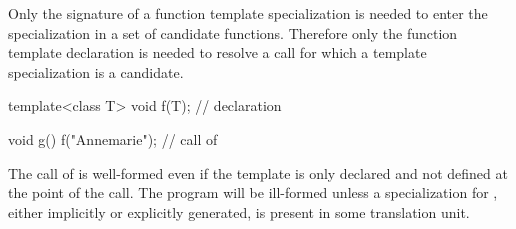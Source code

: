 \pnum
Only the signature of a function template specialization is needed to enter the
specialization in a set of candidate functions.
Therefore only the function template declaration is needed to resolve a call
for which a template specialization is a candidate.
\begin{example}
\begin{codeblock}
template<class T> void f(T);    // declaration

void g() {
  f("Annemarie");               // call of 
}
\end{codeblock}

The call of
is well-formed even if the template
is only declared and not defined at the point of the call.
The program will be ill-formed unless a specialization for
,
either implicitly or explicitly generated,
is present in some translation unit.
\end{example}

